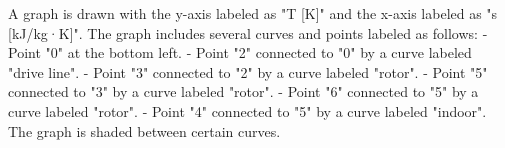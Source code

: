 A graph is drawn with the y-axis labeled as "T [K]" and the x-axis labeled as "s [kJ/kg·K]". The graph includes several curves and points labeled as follows:  
- Point "0" at the bottom left.  
- Point "2" connected to "0" by a curve labeled "drive line".  
- Point "3" connected to "2" by a curve labeled "rotor".  
- Point "5" connected to "3" by a curve labeled "rotor".  
- Point "6" connected to "5" by a curve labeled "rotor".  
- Point "4" connected to "5" by a curve labeled "indoor".  
The graph is shaded between certain curves.